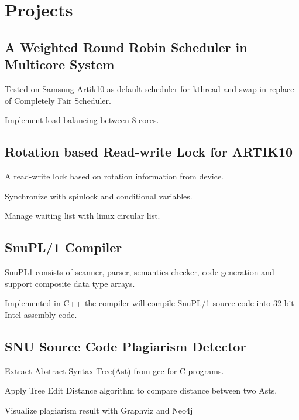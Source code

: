 \documentclass[letterpaper]{article}
\renewenvironment{itemize}{
  \begin{list}{}{
    \setlength{\leftmargin}{1.5em}
  }
}{
  \end{list}
}
\begin{document}
\section*{Projects}

\subsection*{A Weighted Round Robin Scheduler in Multicore System}
\begin{itemize}
	\item Tested on Samsung Artik10 as default scheduler for kthread and swap in replace of Completely Fair Scheduler.
	\item Implement load balancing between 8 cores.
\end{itemize}

\subsection*{Rotation based Read-write Lock for ARTIK10}
\begin{itemize}
\item A read-write lock based on rotation information from device. 
\item Synchronize with spinlock and conditional variables. 
\item Manage waiting list with linux circular list.	\\
\end{itemize}

\subsection*{SnuPL/1 Compiler}
\begin{itemize}
\item SnuPL1 consists of scanner, parser, semantics checker, code generation and support composite data type arrays. 
\item Implemented in C++ the compiler will compile SnuPL/1 source code into 32-bit Intel assembly code.	\\
\end{itemize}

\subsection*{SNU Source Code Plagiarism Detector}
\begin{itemize}
\item Extract Abstract Syntax Tree(Ast) from gcc for C programs.	
\item Apply Tree Edit Distance algorithm to compare distance between two Asts.	
\item Visualize plagiarism result with Graphviz and Neo4j	\\
\end{itemize}
\end{document}
